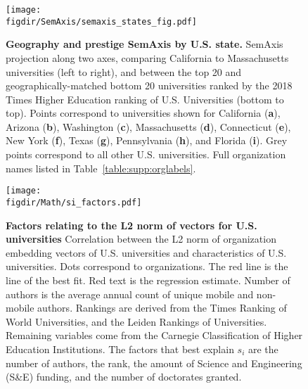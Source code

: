 \documentclass[12pt]{article} %
\def\figdir{../Figs}
\begin{document}
%
%
\begin{figure}[hp!]
	\centering
	\texttt{[image: \\figdir/SemAxis/semaxis\_states\_fig.pdf]}
	\caption{
		\textbf{Geography and prestige SemAxis by U.S. state.}
		SemAxis projection along two axes, comparing California to Massachusetts universities (left to right), and between the top 20 and geographically-matched bottom 20 universities ranked by the 2018 Times Higher Education ranking of U.S. Universities (bottom to top).
		Points correspond to universities shown for California (\textbf{a}), Arizona (\textbf{b}), Washington (\textbf{c}), Massachusetts (\textbf{d}), Connecticut (\textbf{e}), New York (\textbf{f}), Texas (\textbf{g}), Pennsylvania (\textbf{h}), and Florida (\textbf{i}).
		Grey points correspond to all other U.S. universities.
		Full organization names listed in Table~\ref{table:supp:orglabels}.
	}
	\label{fig:supp:semaxis_states}
\end{figure}


%
%



%
%
\begin{figure}[hp!]
	\centering
	\texttt{[image: \\figdir/Math/si\_factors.pdf]}
	\caption{
		\textbf{Factors relating to the L2 norm of vectors for U.S. universities}
		Correlation between the L2 norm of organization embedding vectors of U.S. universities and characteristics of U.S. universities. 
		Dots correspond to organizations.	
		The red line is the line of  the best fit. 
		Red text is the regression estimate.
		Number of authors is the average annual count of unique mobile and non-mobile authors.
		Rankings are derived from the Times Ranking of World Universities, and the Leiden Rankings of Universities. 
		Remaining variables come from the Carnegie Classification of Higher Education Institutions.
		The factors that best explain $s_i$ are the number of authors, the rank, the amount of Science and Engineering (S\&E) funding, and the number of doctorates granted. 
	}
	\label{fig:supp:length_vs_metaInfo}
\end{figure}



\clearpage
\printbibliography{}
\end{document}

